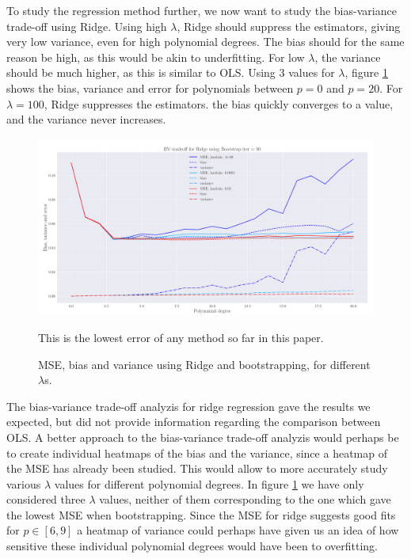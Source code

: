 \documentclass[reprint,english,notitlepage,aps,nobalancelastpage,nofootinbib]{revtex4-1}  %
\begin{document}
To study the regression method further, we now want to study the bias-variance trade-off using Ridge. Using high $\lambda$, Ridge should suppress the estimators, giving very low variance, even for high polynomial degrees. The bias should for the same reason be high, as this would be akin to underfitting. For low $\lambda$, the variance should be much higher, as this is similar to OLS.  Using 3 values for $\lambda$, figure \ref{fig:Ridge_boot_BVT} shows the bias, variance and error for polynomials between $p=0$ and $p=20$. For $\lambda=100$, Ridge suppresses the estimators.   the bias quickly converges to a value, and the variance never increases.

\begin{figure}[h]
	\includegraphics[width=\linewidth]{LBVT_Ridge_Bootstrap_n30_eps0_2_p20_lmbm8_m2.pdf}
	\caption{MSE, bias and variance using Ridge and bootstrapping, for different $\lambda$s.}
	\label{fig:Ridge_boot_BVT}This is the lowest error of any method so far in this paper.
\end{figure}

The bias-variance trade-off analyzis for ridge regression gave the results we expected, but did not provide information regarding the comparison between OLS. A better approach to the bias-variance trade-off analyzis would perhaps be to create individual heatmaps of the bias and the variance, since a heatmap of the MSE has already been studied. This would allow to more accurately study various $\lambda$ values for different polynomial degrees. In figure \ref{fig:Ridge_boot_BVT} we have only considered three $\lambda$ values, neither of them corresponding to the one which gave the lowest MSE when bootstrapping. Since the MSE for ridge suggests good fits for $p\in[6,9]$ a heatmap of variance could perhaps have given us an idea of how sensitive these individual polynomial degrees would have been to overfitting.
\end{document}
